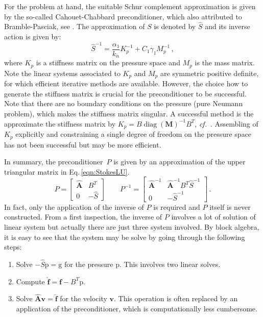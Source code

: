 \documentclass[review]{revtex4-1}
\newcommand{\cf}{\textit{cf.}\ }
\newcommand{\diag}[1]{\operatorname{diag}\left(#1\right)}
\begin{document}
For the problem at hand, the suitable Schur complement approximation is given by the so-called Cahouet-Chabbard preconditioner, which also attributed to Bramble-Pasciak, see \cite{Benzi2005,Bramble1997,Cahouet1988,Mardal2004}. The approximation of $S$ is denoted by $\hat{S}$ and its inverse action is given by:
\begin{equation}
	\hat{S}^{-1}=\frac{\alpha_1}{k_n}K_p^{-1}+C_1\gamma_1M_p^{-1}\,,
\end{equation}
where $K_p$ is a stiffness matrix on the pressure space and $M_p$ is the mass matrix. Note the linear systems associated to $K_p$ and $M_p$ are symmetric positive definite, for which efficient iterative methods are available. However, the choice how to generate the stiffness matrix is crucial for the preconditioner to be successful. Note that there are no boundary conditions on the pressure (pure Neumann problem), which makes the stiffness matrix singular. A successful method is the approximate the stiffness matrix by $K_p=B \diag{\mathbf{M}}^{-1} B^T$, \cf \cite{Cahouet1988}. Assembling of $K_p$ explicitly and constraining a single degree of freedom on the pressure space has not been successful but may be more efficient.

In summary, the preconditioner~$P$ is given by an approximation of the upper triangular matrix in Eq.\,\eqref{eqn:StokesLU}.
\begin{equation}
	P=\begin{bmatrix} \hat{\mathbf{A}} & B^T \\ 0 & -\hat{S}\end{bmatrix}\qquad
	P^{-1}=\begin{bmatrix} \hat{\mathbf{A}}^{-1} & \hat{\mathbf{A}}^{-1}B^T\hat{S}^{-1} \\ 0 & -\hat{S}^{-1}\end{bmatrix}\,.
\end{equation}
In fact, only the application of the inverse of $P$ is required and $P$ itself is never constructed. From a first inspection, the inverse of $P$ involves a lot of solution of linear system but actually there are just three system involved. By block algebra, it is easy to see that the system may be solve by going through the following steps:
\begin{enumerate}
	\item Solve $-\hat{S}\mathrm{p}=\mathrm{g}$ for the pressure $\mathrm{p}$. This involves two linear solves. 
	\item Compute $\hat{\mathbf{f}}=\mathbf{f}-B^T\mathrm{p}$.
	\item Solve $\hat{\mathbf{A}}\mathbf{v}=\hat{\mathbf{f}}$ for the velocity $\mathbf{v}$. This operation is often replaced by an application of the preconditioner, which is computationally less cumbersome.
\end{enumerate}
\end{document}
